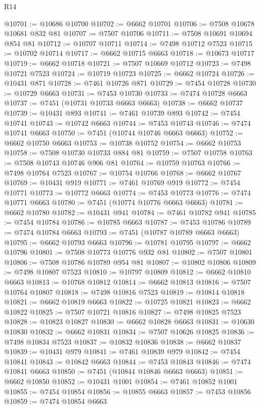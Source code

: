 \begin{lexlean}{R14}
\begin{coremodule}
{{{{{{{{{{{{{{{{{{{{{{{{{{{{{{{{{{{{{{{{{{{{{{{{{{{{{{{{{{{{{{{{{{{{{{{{{{{{{{{{{{@10701 := @10686 @10700
@10702 := @6662 @10701
@10706 := @7508 @10678 @10681 @832 @81
@10707 := @7507 @10706
@10711 := @7508 @10691 @10694 @854 @81
@10712 := @10707 @10711
@10714 := @7498 @10712 @7523
@10715 := @10702 @10714
@10717 := @6662 @10715 @6663
@10718 := @10673 @10717
@10719 := @6662 @10718
@10721 := @7507 @10669 @10712
@10723 := @7498 @10721 @7523
@10724 := @10719 @10723
@10725 := @6662 @10724
@10726 := @10431 @871
@10728 := @7461 @10726 @871
@10729 := @7454 @10728
@10730 := @10729 @6663
@10731 := @7453 @10730
@10733 := @7474 @10728 @6663
@10737 := @7451 (@10731 @10733 @6663 @6663)
@10738 := @6662 @10737
@10739 := @10431 @893
@10741 := @7461 @10739 @893
@10742 := @7454 @10741
@10743 := @10742 @6663
@10744 := @7453 @10743
@10746 := @7474 @10741 @6663
@10750 := @7451 (@10744 @10746 @6663 @6663)
@10752 := @6662 @10750 @6663
@10753 := @10738 @10752
@10754 := @6662 @10753
@10758 := @7508 @10730 @10733 @884 @81
@10759 := @7507 @10758
@10763 := @7508 @10743 @10746 @906 @81
@10764 := @10759 @10763
@10766 := @7498 @10764 @7523
@10767 := @10754 @10766
@10768 := @6662 @10767
@10769 := @10431 @919
@10771 := @7461 @10769 @919
@10772 := @7454 @10771
@10773 := @10772 @6663
@10774 := @7453 @10773
@10776 := @7474 @10771 @6663
@10780 := @7451 (@10774 @10776 @6663 @6663)
@10781 := @6662 @10780
@10782 := @10431 @941
@10784 := @7461 @10782 @941
@10785 := @7454 @10784
@10786 := @10785 @6663
@10787 := @7453 @10786
@10789 := @7474 @10784 @6663
@10793 := @7451 (@10787 @10789 @6663 @6663)
@10795 := @6662 @10793 @6663
@10796 := @10781 @10795
@10797 := @6662 @10796
@10801 := @7508 @10773 @10776 @932 @81
@10802 := @7507 @10801
@10806 := @7508 @10786 @10789 @954 @81
@10807 := @10802 @10806
@10809 := @7498 @10807 @7523
@10810 := @10797 @10809
@10812 := @6662 @10810 @6663
@10813 := @10768 @10812
@10814 := @6662 @10813
@10816 := @7507 @10764 @10807
@10818 := @7498 @10816 @7523
@10819 := @10814 @10818
@10821 := @6662 @10819 @6663
@10822 := @10725 @10821
@10823 := @6662 @10822
@10825 := @7507 @10721 @10816
@10827 := @7498 @10825 @7523
@10828 := @10823 @10827
@10830 := @6662 @10828 @6663
@10831 := @10630 @10830
@10832 := @6662 @10831
@10834 := @7507 @10626 @10825
@10836 := @7498 @10834 @7523
@10837 := @10832 @10836
@10838 := @6662 @10837
@10839 := @10431 @979
@10841 := @7461 @10839 @979
@10842 := @7454 @10841
@10843 := @10842 @6663
@10844 := @7453 @10843
@10846 := @7474 @10841 @6663
@10850 := @7451 (@10844 @10846 @6663 @6663)
@10851 := @6662 @10850
@10852 := @10431 @1001
@10854 := @7461 @10852 @1001
@10855 := @7454 @10854
@10856 := @10855 @6663
@10857 := @7453 @10856
@10859 := @7474 @10854 @6663
}}}}}}}}}}}}}}}}}}}}}}}}}}}}}}}}}}}}}}}}}}}}}}}}}}}}}}}}}}}}}}}}}}}}}}}}}}}}}}}}}}
\end{coremodule}
\end{lexlean}

